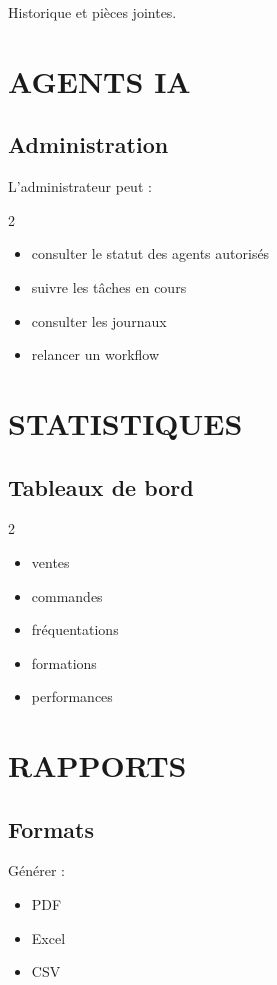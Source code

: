 \documentclass[12pt,a4paper,oneside]{book}
\begin{document}
Historique et pièces jointes.

\chapter{AGENTS IA}

\section{Administration}
L'administrateur peut :
\begin{multicols}{2}
\begin{itemize}
\item consulter le statut des agents autorisés
\item suivre les tâches en cours
\item consulter les journaux
\item relancer un workflow
\end{itemize}
\end{multicols}

\chapter{STATISTIQUES}

\section{Tableaux de bord}
\begin{multicols}{2}
\begin{itemize}
\item ventes
\item commandes
\item fréquentations
\item formations
\item performances
\end{itemize}
\end{multicols}

\chapter{RAPPORTS}

\section{Formats}
Générer :
\begin{itemize}
\item PDF
\item Excel
\item CSV
\end{itemize}
\end{document}
